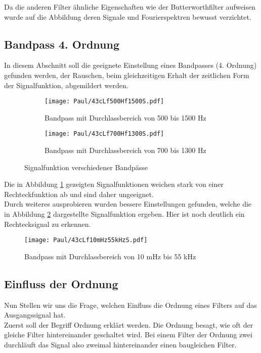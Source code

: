 Da die anderen Filter ähnliche Eigenschaften wie der Butterworthfilter aufweisen wurde auf die Abbildung deren Signale und Fourierspektren bewusst verzichtet.

\newpage
\subsection{Bandpass 4. Ordnung}

In diesem Abschnitt soll die geeignete Einstellung eines Bandpasses (4. Ordnung) gefunden werden, der Rauschen, beim gleichzeitigen Erhalt der zeitlichen Form der Signalfunktion, abgemildert werden.
\begin{figure}[h]
    \centering
    \begin{subfigure}{0.45\textwidth}
        \centering
        \texttt{[image: Paul/43cLf500Hf1500S.pdf]}
        \caption{Bandpass mit Durchlassbereich von 500 bis 1500 Hz}
    \end{subfigure}
    \hfill
    \begin{subfigure}{0.45\textwidth}
        \centering
        \texttt{[image: Paul/43cLf700Hf1300S.pdf]}
        \caption{Bandpass mit Durchlassbereich von 700 bis 1300 Hz}
    \end{subfigure}
    \caption{Signalfunktion verschiedener Bandpässe}
    \label{fig:43cverBa}
\end{figure}

Die in Abbildung \ref{fig:43cverBa} gezeigten Signalfunktionen weichen stark von einer Rechteckfunktion ab und sind daher ungeeignet.\\
Durch weiteres ausprobieren wurden bessere Einstellungen gefunden, welche die in Abbildung \ref{fig:43cBeBa} dargestellte Signalfunktion ergeben. Hier ist noch deutlich ein Rechtecksignal zu erkennen.

\begin{figure}[h]
    \centering
    \texttt{[image: Paul/43cLf10mHz55kHzS.pdf]}
    \caption{Bandpass mit Durchlassbereich von 10 mHz bis 55 kHz}
    \label{fig:43cBeBa}
\end{figure}

\newpage
\subsection{Einfluss der Ordnung}
Nun Stellen wir uns die Frage, welchen Einfluss die Ordnung eines Filters auf das Ausgangssignal hat.\\
Zuerst soll der Begriff Ordnung erklärt werden. Die Ordnung besagt, wie oft der gleiche Filter hintereinander geschaltet wird. Bei einem Filter der Ordnung zwei durchläuft das Signal also zweimal hintereinander einen baugleichen Filter.\\

